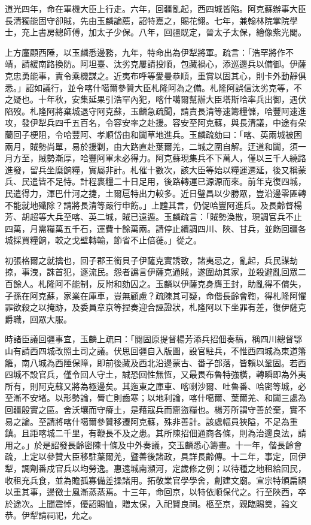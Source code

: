\begin{pinyinscope}
道光四年，命在軍機大臣上行走。六年，回疆亂起，西四城皆陷。阿克蘇辦事大臣長清獨能固守卻賊，先由玉麟論薦，詔特嘉之，賜花翎。七年，兼翰林院掌院學士，充上書房總師傅，加太子少保。八年，回疆既定，晉太子太保，繪像紫光閣。

上方廑顧西陲，以玉麟悉邊務，九年，特命出為伊犁將軍。疏言：「浩罕將作不靖，請緩南路換防。阿坦臺、汰劣克屢請投順，包藏禍心，添巡邊兵以備御。伊薩克忠勇能事，責令乘機謀之。近夷布呼等愛曼恭順，重賞以固其心，則卡外動靜俱悉。」詔如議行，並令喀什噶爾參贊大臣札隆阿為之備。札隆阿誤信汰劣克等，不之疑也。十年秋，安集延果引浩罕內犯，喀什噶爾幫辦大臣塔斯哈率兵出御，遇伏陷歿。札隆阿將棄城退守阿克蘇，玉麟急疏聞，請責長清等速籌糧儲，哈豐阿速進攻，發伊犁兵四千五百名，令容安率之赴援。容安至阿克蘇，與長清議，中途有朵蘭回子梗阻，令哈豐阿、孝順岱由和闐草地進兵。玉麟疏劾曰：「喀、英兩城被困兩月，賊勢尚單，易於援剿，由大路直赴葉爾羌，二城之圍自解。迂道和闐，須一月方至，賊勢漸厚，哈豐阿軍未必得力。阿克蘇現集兵不下萬人，僅以三千人繞路進發，留兵坐糜餉糧，實屬非計。札催十數次，該大臣等始以糧運遷延，後又稱蒙兵、民遣皆不足恃。計程裹糧二十日足用，後路轉運已源源而來。前年克復四城，民遣得力，渾巴什河之捷，土爾扈特出力較多。近日璧昌以少勝眾，豈沿邊零匪轉不能就地殲除？請將長清等嚴行申飭。」上韙其言，仍促哈豐阿進兵。及長齡督楊芳、胡超等大兵至喀、英二城，賊已遠遁。玉麟疏言：「賊勢渙散，現調官兵不止四萬，月需糧萬五千石，運費十餘萬兩。請停止續調四川、陜、甘兵，並飭回疆各城採買糧餉，較之戈壁轉輸，節省不止倍蓰。」從之。

初張格爾之就擒也，回子郡王銜貝子伊薩克實誘致，諸夷忌之，亂起，兵民謀劫掠，事洩，誅首犯，逐流民。怨者譌言伊薩克通賊，遂圍劫其家，並殺避亂回眾二百餘人。札隆阿不能制，反附和劾囚之。玉麟以伊薩克身膺王封，助亂得不償失，子孫在阿克蘇，家業在庫車，豈無顧慮？疏陳其可疑，命偕長齡會鞫，得札隆阿懼罪欲殺之以掩跡，及委員章京等捏奏迎合誣證狀，札隆阿以下坐罪有差，復伊薩克爵職，回眾大服。

時諸臣議回疆事宜，玉麟上疏曰：「閱固原提督楊芳添兵招佃奏稿，稱四川總督鄂山有請西四城改照土司之議。伏思回疆自入版圖，設官駐兵，不惟西四城為東道籓籬，南八城為西陲保障，即前後藏及西北沿邊蒙古、番子部落，皆賴以鞏固。若西四城不設官兵，僅令回人守土，誠恐回性無恆，又最畏布魯特強橫，轉瞬即為外夷所有，則阿克蘇又將為極邊矣。其迤東之庫車、喀喇沙爾、吐魯番、哈密等城，必至漸不安堵。以形勢論，脣亡則齒寒；以地利論，喀什噶爾、葉爾羌、和闐三處為回疆殷實之區。舍沃壤而守瘠土，是藉寇兵而齎盜糧也。楊芳所謂守善於棄，實不易之論。至請將喀什噶爾參贊移遷阿克蘇，殊非善計。該處幅員狹隘，不足為重鎮。且距喀城二千里，有鞭長不及之患。其所陳招佃通商各條，則為治邊良法，請用之。」於是詔發長齡密陳十條及中外奏議，交玉麟悉心籌畫。十一年，偕長齡會疏，上定以參贊大臣移駐葉爾羌，暨善後諸政，具詳長齡傳。十二年，事定，回伊犁，調劑番戍官兵以均勞逸。惠遠城南瀕河，定歲修之例；以待種之地租給回民，收租充兵食，並為贍孤寡備差操諸用。拓敬業官學學舍，創建文廟。宣宗特頒扁額以重其事，邊徼士風漸蒸蒸焉。十三年，命回京，以特依順保代之。行至陜西，卒於途次。上聞震悼，優詔賜恤，贈太保，入祀賢良祠。柩至京，親臨賜奠，謚文恭。伊犁請祠祀，允之。


\end{pinyinscope}

